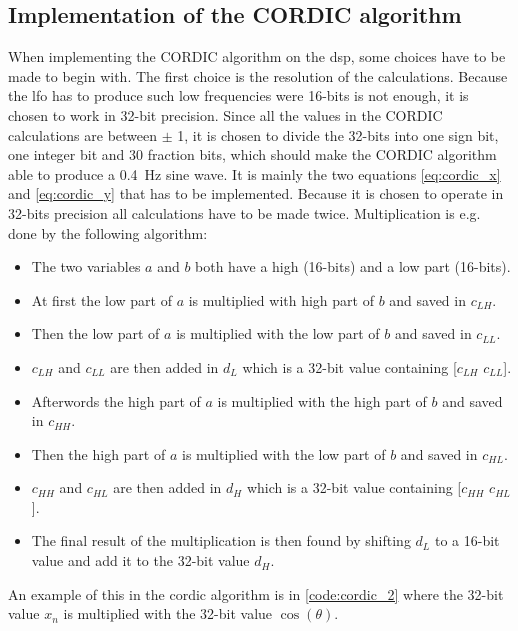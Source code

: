 \subsection{Implementation of the CORDIC algorithm}
When implementing the CORDIC algorithm on the \gls{dsp}, some choices have to be made to begin with. The first choice is the resolution of the calculations. Because the \gls{lfo} has to produce such low frequencies were 16-bits is not enough, it is chosen to work in 32-bit precision. Since all the values in the CORDIC calculations are between $\pm$ 1, it is chosen to divide the 32-bits into one sign bit, one integer bit and 30 fraction bits, which should make the CORDIC algorithm able to produce a \SI{0.4}{\hertz} sine wave.
It is mainly the two equations \autoref{eq:cordic_x} and \autoref{eq:cordic_y} that has to be implemented. Because it is chosen to operate in 32-bits precision all calculations have to be made twice. Multiplication is e.g. done by the following algorithm:
\begin{itemize}
\item The two variables $a$ and $b$ both have a high (16-bits) and a low part (16-bits).
\item At first the low part of $a$ is multiplied with high part of $b$ and saved in $c_{LH}$.
\item Then the low part of $a$ is multiplied with the low part of $b$ and saved in $c_{LL}$.
\item $c_{LH}$ and $c_{LL}$ are then added in $d_L$ which is a 32-bit value containing [$c_{LH}$ $c_{LL}$].
\item Afterwords the high part of $a$ is multiplied with the high part of $b$ and saved in $c_{HH}$.
\item Then the high part of $a$ is multiplied with the low part of $b$ and saved in $c_{HL}$.
\item $c_{HH}$ and $c_{HL}$ are then added in $d_H$ which is a 32-bit value containing [$c_{HH}$ $c_{HL}$].
\item The final result of the multiplication is then found by shifting $d_L$ to a 16-bit value and add it to the 32-bit value $d_H$.
\end{itemize}

An example of this in the \gls{cordic} algorithm is in \autoref{code:cordic_2} where the 32-bit value $x_n$ is multiplied with the 32-bit value $\cos(\theta)$.


